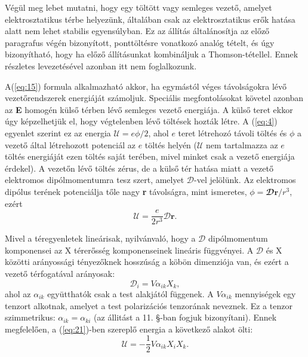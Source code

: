 \documentclass{article}
\begin{document}
Végül meg lebet mutatni, hogy egy töltött vagy semleges vezető, amelyet elektrosztatikus térbe helyezünk, általában csak az elektrosztatikus erők hatása alatt nem lehet stabilis egyensúlyban. Ez az állítás általánosítja az előző paragrafus végén bizonyított, ponttöltésre vonatkozó analóg tételt, és úgy bizonyítható, hogy ha előző állításunkat kombináljuk a Thomson-tétellel. Ennek részletes levezetésével azonban itt nem foglalkozunk.

A(\ref{eq:15}) formula alkalmazható akkor, ha egymástól véges távolságokra lévő vezetőrendszerek energiáját számoljuk. Speciális megfontolásokat követel azonban az \textbf{E} homogén külső térben lévő semleges vezető energiája. A külső teret ekkor úgy képzelhetjük el, hogy végtelenben lévő töltések hozták létre. A (\ref{eq:4}) egyenlet szerint ez
az energia $\mathcal{U} = e \phi /2$, ahol $e$ teret létrehozó távoli töltés és $\phi$ a vezető által létrehozott potenciál az $e$ töltés helyén ($\mathcal{U}$ nem tartalmazza az $e$ töltés energiáját ezen töltés saját terében, mivel minket csak a vezető energiája érdekel). A vezetőn lévő töltés zérus, de a külső tér hatása miatt a vezető elektromos dipólmomentumra tesz szert, amelyet $\mathcal{D}$-vel jelölünk. Az elektromos dipólus terének potenciálja tőle nagy \textbf{r} távolságra, mint ismeretes, $\phi = \mathbfcal{D}\textbf{r}/r^3$, ezért
\begin{equation} \label{eq:21}
    \mathcal{U} = \frac{e}{2r^3} \mathcal{D}\textbf{r}.
\end{equation}

Mivel a téregyenletek lineárisak, nyilvánvaló, hogy a $\mathcal{D}$ dipólmomentum komponensei az X térerősség komponenseinek lineáris függvényei. A $\mathcal{D}$ és X közötti arányossági tényezőknek hosszúság a köbön dimenziója van, és ezért a vezető térfogatával arányosak:
\begin{equation} \label{eq:22}
    \mathcal{D}_i = V \alpha_{ik} X_k ,
\end{equation}
ahol az $\alpha_{ik}$ együtthatók csak a test alakjától függenek. A $V \alpha_{ik}$ mennyiségek egy tenzort alkotnak, amelyet a test polarizációs tenzorának neveznek. Ez a tenzor szimmetrikus: $\alpha_{ik} = \alpha_{ki}$ (az állitást a 11. §-ban fogjuk bizonyítani). Ennek megfelelően, a (\ref{eq:21})-ben szereplő energia a következő alakot ölti:
\begin{equation} \label{eq:23}
    \mathcal{U} = -\frac{1}{2} V \alpha_{ik} X_i X_k .
\end{equation}
\end{document}
